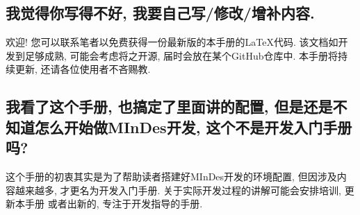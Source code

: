 \subsection{我觉得你写得不好, 我要自己写/修改/增补内容.}
欢迎! 您可以联系笔者以免费获得一份最新版的本手册的{\LaTeX}代码. 该文档如开发到足够成熟, 可能会考虑将之开源, 
届时会放在某个GitHub仓库中. 本手册将持续更新, 还请各位使用者不吝赐教.

\subsection{我看了这个手册, 也搞定了里面讲的配置, 但是还是不知道怎么开始做MInDes开发, 这个不是开发入门手册吗? }
这个手册的初衷其实是为了帮助读者搭建好MInDes开发的环境配置, 但因涉及内容越来越多, 才更名为开发入门手册. 关于实际开发过程的讲解可能会安排培训, 更新本手册
或者出新的, 专注于开发指导的手册.

\endinput